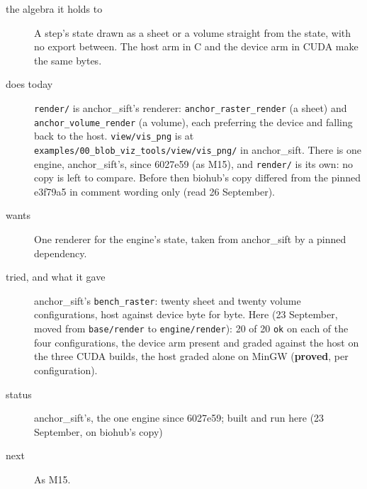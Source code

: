 \begin{description}
\item[{the algebra it holds to}] A step's state drawn as a sheet or a volume straight from the state, with no export between. The host arm in C and the device arm in CUDA make the same bytes.
\item[{does today}] \texttt{render/\allowbreak{}} is anchor\_\allowbreak{}sift's renderer: \texttt{anchor\_\allowbreak{}raster\_\allowbreak{}render} (a sheet) and \texttt{anchor\_\allowbreak{}volume\_\allowbreak{}render} (a volume), each preferring the device and falling back to the host. \texttt{view/\allowbreak{}vis\_\allowbreak{}png} is at \texttt{examples/\allowbreak{}00\_\allowbreak{}blob\_\allowbreak{}viz\_\allowbreak{}tools/\allowbreak{}view/\allowbreak{}vis\_\allowbreak{}png/\allowbreak{}} in anchor\_\allowbreak{}sift. There is one engine, anchor\_\allowbreak{}sift's, since 6027e59 (as M15), and \texttt{render/\allowbreak{}} is its own: no copy is left to compare. Before then biohub's copy differed from the pinned e3f79a5 in comment wording only (read 26 September).
\item[{wants}] One renderer for the engine's state, taken from anchor\_\allowbreak{}sift by a pinned dependency.
\item[{tried, and what it gave}] anchor\_\allowbreak{}sift's \texttt{bench\_\allowbreak{}raster}: twenty sheet and twenty volume configurations, host against device byte for byte. Here (23 September, moved from \texttt{base/\allowbreak{}render} to \texttt{engine/\allowbreak{}render}): 20 of 20 \texttt{ok} on each of the four configurations, the device arm present and graded against the host on the three CUDA builds, the host graded alone on MinGW (\textbf{proved}, per configuration).
\item[{status}] anchor\_\allowbreak{}sift's, the one engine since 6027e59; built and run here (23 September, on biohub's copy)
\item[{next}] As M15.
\end{description}

